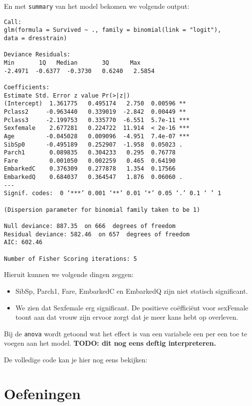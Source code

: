 En met \texttt{summary} van het model bekomen we volgende output:

\begin{lstlisting}
Call:
glm(formula = Survived ~ ., family = binomial(link = "logit"), 
data = dresstrain)

Deviance Residuals: 
Min       1Q   Median       3Q      Max  
-2.4971  -0.6377  -0.3730   0.6240   2.5854  

Coefficients:
Estimate Std. Error z value Pr(>|z|)    
(Intercept)  1.361775   0.495174   2.750  0.00596 ** 
Pclass2     -0.963440   0.339019  -2.842  0.00449 ** 
Pclass3     -2.199753   0.335770  -6.551  5.7e-11 ***
Sexfemale    2.677281   0.224722  11.914  < 2e-16 ***
Age         -0.045028   0.009096  -4.951  7.4e-07 ***
SibSp0      -0.495189   0.252907  -1.958  0.05023 .  
Parch1       0.089835   0.304233   0.295  0.76778    
Fare         0.001050   0.002259   0.465  0.64190    
EmbarkedC    0.376309   0.277878   1.354  0.17566    
EmbarkedQ    0.684037   0.364547   1.876  0.06060 .  
---
Signif. codes:  0 ‘***’ 0.001 ‘**’ 0.01 ‘*’ 0.05 ‘.’ 0.1 ‘ ’ 1

(Dispersion parameter for binomial family taken to be 1)

Null deviance: 887.35  on 666  degrees of freedom
Residual deviance: 582.46  on 657  degrees of freedom
AIC: 602.46

Number of Fisher Scoring iterations: 5
\end{lstlisting}

Hieruit kunnen we volgende dingen zeggen:
\begin{itemize}
	\item SibSp, Parch1, Fare, EmbarkedC en EmbarkedQ zijn niet statisch significant. 
	\item We zien dat Sexfemale erg significant. De positieve co\"effici\"ent voor sexFemale toont aan dat vrouw zijn ervoor zorgt dat je meer kans hebt op overleven.  
\end{itemize}

Bij de \texttt{anova} wordt getoond wat het effect is van een variabele een per een toe te voegen aan het model. \textbf{TODO: dit nog eens deftig interpreteren.}


De volledige code kan je hier nog eens bekijken:


\section{Oefeningen}

